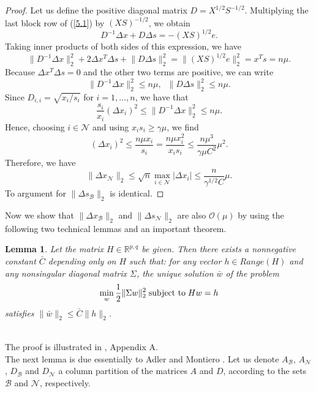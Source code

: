 \documentclass[a4paper,10 pt,titlepage,twoside]{book}
\theoremstyle{plain}
\newtheorem{lem}[thm]{Lemma}
\theoremstyle{definition}
\theoremstyle{remark}
\begin{document}
\begin{proof}
	Let us define the positive diagonal matrix $D = X^{1/2}S^{-1/2}$. Multiplying the last block row of (\ref{5.1}) by $(XS)^{-1/2}$, we obtain 
	\begin{equation*}
	D^{-1}\Delta x + D \Delta s = -(XS)^{1/2}e.
	\end{equation*}
	Taking inner products of both sides of this expression, we have
	\begin{equation*}
	\lVert D^{-1}\Delta x \rVert^{2}_{2} + 2\Delta x^{T}\Delta s+ \lVert D\Delta s \rVert^{2}_{2}= \lVert(XS)^{1/2}e\rVert^{2}_{2}= x^{T}s= n\mu.
	\end{equation*}
	Because $\Delta x^{T}\Delta s= 0$ and the other two terms are positive, we can write
	\begin{equation*}
	\lVert D^{-1}\Delta x\rVert^{2}_{2}\leq n\mu, \;\;\lVert D\Delta s\rVert^{2}_{2}\leq n\mu.
	\end{equation*}
	Since $D_{i,i}= \sqrt{x_{i}/s_{i}}$ for $i=1,\dots,n$, we have that
	\begin{equation*}
	\frac{s_{i}}{x_{i}}(\Delta x_{i})^{2}\leq\lVert D^{-1}\Delta x\rVert^{2}_{2}\leq n\mu.
	\end{equation*}
	Hence, choosing $i\in\mathcal{N}$ and using $x_{i}s_{i}\geq\gamma\mu$, we find
	\begin{equation*}
	(\Delta x_{i})^{2}\leq\frac{n\mu x_{i}}{s_{i}}=\frac{n\mu x_{i}^{2}}{x_{i}s_{i}}\leq\frac{n\mu^{3}}{\gamma\mu C^{2}}\mu^{2}.
	\end{equation*}
	Therefore, we have 
	\begin{equation*}
	\lVert \Delta x_{\mathcal{N}}\rVert_{2} \leq \sqrt{n}\max\limits_{i \in \mathcal{N}}|\Delta x_{i}|\leq\frac{n}{\gamma^{1/2}C}\mu.
	\end{equation*}
	To argument for $\lVert \Delta s_{\mathcal{B}}\rVert_{2}$ is identical.
\end{proof}
Now we show that $\lVert \Delta x_{\mathcal{B}}\rVert_{2}$ and $\lVert \Delta s_{\mathcal{N}}\rVert_{2}$ are also $\mathcal{O}(\mu)$ by using the following two technical lemmas and an important theorem.
\begin{lem} \label{(T)}
	Let the matrix $H\in\mathbb{R}^{p,q}$ be given. Then there exists a nonnegative constant $\bar{C}$ depending only on $H$ such that: for any vector $h\in Range(H)$ and any nonsingular diagonal matrix $\Sigma$, the unique solution $\bar{w}$ of the problem
	\begin{align*}
	\min\limits_{w}\frac{1}{2}\lVert\Sigma w\rVert^{2}_{2} \text{\;subject to\;} Hw = h
	\end{align*}
	satisfies $\lVert\bar{w}\rVert_{2}\leq \bar{C}\lVert h\rVert_{2}$.
\end{lem}\\
The proof is illustrated in \cite{Wright}, Appendix A.\\
The next lemma is due essentially to Adler and Montiero \cite{ADL}.  Let us denote $A_{\mathcal{B}}$, $A_{\mathcal{N}}$, $D_{\mathcal{B}}$ and $D_{\mathcal{N}}$ a column partition of the matrices $A$ and $D$, according to the sets $\mathcal{B}$ and $\mathcal{N}$, respectively.
\end{document}
